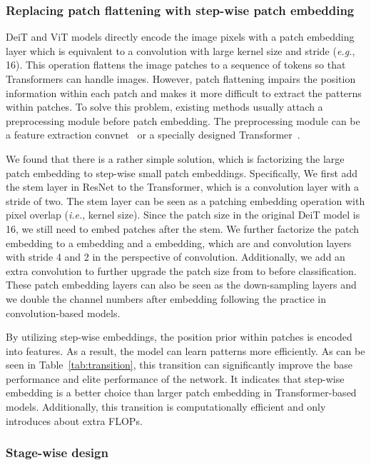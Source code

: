\documentclass[10pt,twocolumn,letterpaper]{article}
\begin{document}
\subsubsection{Replacing patch flattening with step-wise patch embedding}
\label{methodology:transition:flattening}

DeiT and ViT models directly encode the image pixels with a patch embedding layer which is equivalent to a convolution with large kernel size and stride (\textit{e.g.}, 16). This operation flattens the image patches to a sequence of tokens so that Transformers can handle images. However, patch flattening impairs the position information within each patch and makes it more difficult to extract the patterns within patches. To solve this problem, existing methods usually attach a preprocessing module before patch embedding. The preprocessing module can be a feature extraction convnet~\cite{dosovitskiy2020image} or a specially designed Transformer~\cite{yuan2021tokens}.

We found that there is a rather simple solution, which is factorizing the large patch embedding to step-wise small patch embeddings. Specifically, We first add the stem layer in ResNet to the Transformer, which is a  convolution layer with a stride of two. The stem layer can be seen as a  patching embedding operation with pixel overlap (\textit{i.e.},  kernel size). Since the patch size in the original DeiT model is 16, we still need to embed  patches after the stem. We further factorize the  patch embedding to a  embedding and a  embedding, which are  and  convolution layers with stride 4 and 2 in the perspective of convolution. Additionally, we add an extra  convolution to further upgrade the patch size from  to  before classification. These patch embedding layers can also be seen as the down-sampling layers and we double the channel numbers after embedding following the practice in convolution-based models.

By utilizing step-wise embeddings, the position prior within patches is encoded into features. As a result, the model can learn patterns more efficiently. As can be seen in Table~\ref{tab:transition}, this transition can significantly improve the base performance and elite performance of the network. It indicates that step-wise embedding is a better choice than larger patch embedding in Transformer-based models. Additionally, this transition is computationally efficient and only introduces about  extra FLOPs.

\subsubsection{Stage-wise design}
\label{methodology:transition:stage}
\end{document}
